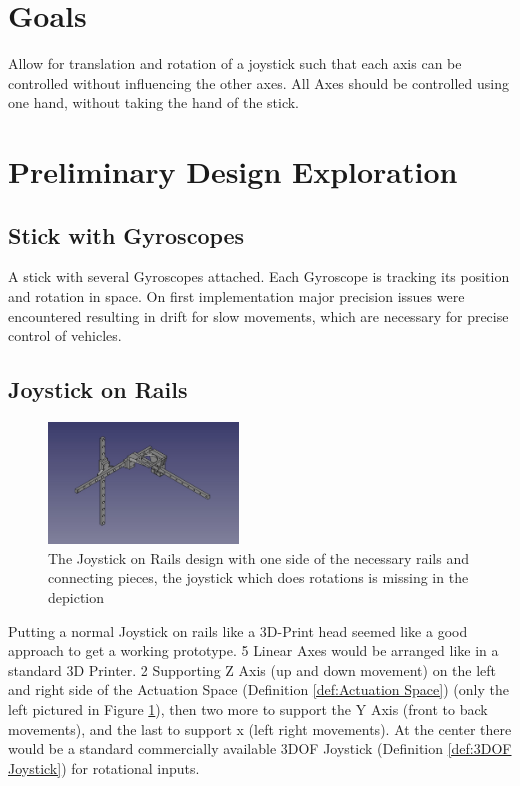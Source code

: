 \documentclass[12pt,a4paper]{report}
\def\refdefinition#1{#1 \citedefinition{#1}}
\def\citedefinition#1{(Definition \ref{def:#1})}
\def\reffigure#1{Figure \ref{fig:#1}}
\begin{document}
	\section{Goals}
		Allow for translation and rotation of a joystick such that each axis can be controlled without influencing the other axes.
		All Axes should be controlled using one hand, without taking the hand of the stick.
		
	\section{Preliminary Design Exploration}
		\subsection{Stick with Gyroscopes}
			A stick with several Gyroscopes attached.
			Each Gyroscope is tracking its position and rotation in space.
			On first implementation major precision issues were encountered resulting in drift for slow movements, which are necessary for precise control of vehicles.
		\subsection{Joystick on Rails}
			\begin{figure}
				\includegraphics[width=0.45\textwidth]{"media/Joystick_on_Rails_v5"}
				\caption{The Joystick on Rails design with one side of the necessary rails and connecting pieces, the joystick which does rotations is missing in the depiction}
				\label{fig:v5}
			\end{figure}
			Putting a normal Joystick on rails like a 3D-Print head seemed like a good approach to get a working prototype. 5 Linear Axes would be arranged like in a standard 3D Printer. 2 Supporting Z Axis (up and down movement) on the left and right side of the \refdefinition{Actuation Space}  (only the left pictured in \reffigure{v5}), then two more to support the Y Axis (front to back movements), and the last to support x (left right movements). At the center there would be a standard commercially available \refdefinition{3DOF Joystick} for rotational inputs.
	
	\newpage
	\listoffigures
	\newpage
	\listoftables
	\newpage
	
	
\end{document}
